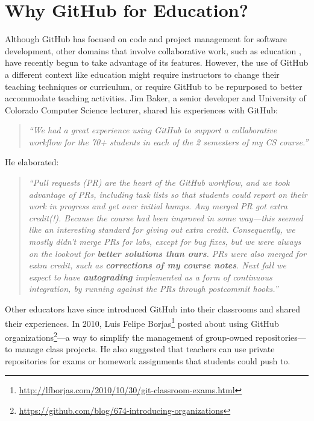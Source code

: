 \section{Why GitHub for Education?}
Although GitHub has focused on code and project management for software development, other domains that involve collaborative work, such as education \cite{griffin2013github}, have recently begun to take advantage of its features. However, the use of GitHub a different context like education might require instructors to change their teaching techniques or curriculum, or require GitHub to be repurposed to better accommodate teaching activities. Jim Baker, a senior developer and University of Colorado Computer Science lecturer, shared his experiences with GitHub: \begin{quote}\textit{``We had a great experience using GitHub to support a collaborative workflow for the 70+ students in each of the 2 semesters of my CS course.''}\end{quote} He elaborated: \begin{quote}\textit{``Pull requests (PR) are the heart of the GitHub workflow, and we took advantage of PRs, including task lists so that students could report on their work in progress and get over initial humps. Any merged PR got extra credit(!). Because the course had been improved in some way---this seemed like an interesting standard for giving out extra credit. Consequently, we mostly didn't merge PRs for labs, except for bug fixes, but we were always on the lookout for \textbf{better solutions than ours}. PRs were also merged for extra credit, such as \textbf{corrections of my course notes}. Next fall we expect to have \textbf{autograding} implemented as a form of continuous integration, by running against the PRs through postcommit hooks.''}\end{quote}

Other educators have since introduced GitHub into their classrooms and shared their experiences. In 2010, Luis Felipe Borjas\footnote{\url{http://lfborjas.com/2010/10/30/git-classroom-exams.html}} posted about using GitHub organizations\footnote{\url{https://github.com/blog/674-introducing-organizations}}---a way to simplify the management of group-owned repositories---to manage class projects. He also suggested that teachers can use private repositories for exams or homework assignments that students could push to.

